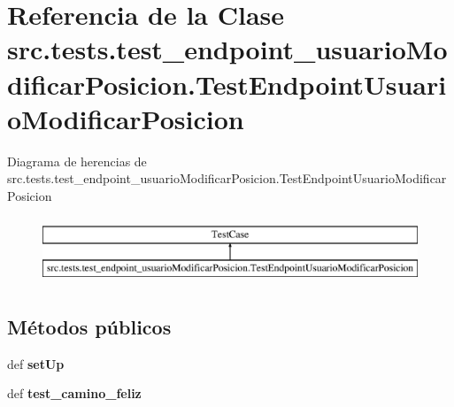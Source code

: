 \hypertarget{classsrc_1_1tests_1_1test__endpoint__usuario_modificar_posicion_1_1_test_endpoint_usuario_modificar_posicion}{\section{Referencia de la Clase src.\-tests.\-test\-\_\-endpoint\-\_\-usuario\-Modificar\-Posicion.\-Test\-Endpoint\-Usuario\-Modificar\-Posicion}
\label{classsrc_1_1tests_1_1test__endpoint__usuario_modificar_posicion_1_1_test_endpoint_usuario_modificar_posicion}
}
Diagrama de herencias de src.\-tests.\-test\-\_\-endpoint\-\_\-usuario\-Modificar\-Posicion.\-Test\-Endpoint\-Usuario\-Modificar\-Posicion\begin{figure}[H]
\begin{center}
\leavevmode
\includegraphics[height=2.000000cm]{classsrc_1_1tests_1_1test__endpoint__usuario_modificar_posicion_1_1_test_endpoint_usuario_modificar_posicion}
\end{center}
\end{figure}
\subsection*{Métodos públicos}
\begin{DoxyCompactItemize}
\item 
\hypertarget{classsrc_1_1tests_1_1test__endpoint__usuario_modificar_posicion_1_1_test_endpoint_usuario_modificar_posicion_a80befdf63340327eb97ec99be39ae959}{def {\bfseries set\-Up}}\label{classsrc_1_1tests_1_1test__endpoint__usuario_modificar_posicion_1_1_test_endpoint_usuario_modificar_posicion_a80befdf63340327eb97ec99be39ae959}

\item 
\hypertarget{classsrc_1_1tests_1_1test__endpoint__usuario_modificar_posicion_1_1_test_endpoint_usuario_modificar_posicion_a2c9e3cd76e02f29e778aaa3b9ce9cf43}{def {\bfseries test\-\_\-camino\-\_\-feliz}}\label{classsrc_1_1tests_1_1test__endpoint__usuario_modificar_posicion_1_1_test_endpoint_usuario_modificar_posicion_a2c9e3cd76e02f29e778aaa3b9ce9cf43}

\end{DoxyCompactItemize}
